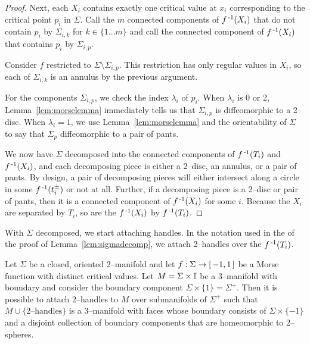 \begin{proof}
	Next, each $X_i$ contains exactly one critical value at $x_i$ corresponding to the critical point $p_i$ in $\Sigma$.
	Call the $m$ connected components of $f^{\,\text{-}1}(X_i)$ that do not contain $p_i$ by $\Sigma_{i,k}$ for $k\in\{1\dots m\}$ and call the connected component of $f^{\,\text{-}1}(X_i)$ that contains $p_i$ by $\Sigma_{i,p}$.
	
	Consider $f$ restricted to $\Sigma\setminus\Sigma_{i,p}$.
	This restriction has only regular values in $X_i$, so each of $\Sigma_{i,k}$ is an annulus by the previous argument.
	
	For the components $\Sigma_{i,p}$, we check the index $\lambda_i$ of $p_i$.
	When $\lambda_i$ is 0 or 2, Lemma~\ref{lem:morselemma} immediately tells us that $\Sigma_{i,p}$ is diffeomorphic to a 2--disc.
	When $\lambda_i=1$, we use Lemma~\ref{lem:morselemma} and the orientability of $\Sigma$ to say that $\Sigma_p$ diffeomorphic to a pair of pants.
	
	We now have $\Sigma$ decomposed into the connected components of $f^{\,\text{-}1}(T_i)$ and $f^{\,\text{-}1}(X_i)$, and each decomposing piece is either a 2--disc, an annulus, or a pair of pants.
	By design, a pair of decomposing pieces will either intersect along a circle in some $f^{\,\text{-}1}(t_i^\pm)$ or not at all.
	Further, if a decomposing piece is a 2--disc or pair of pants, then it is a connected component of $f^{\,\text{-}1}(X_i)$ for some $i$.
	Because the $X_i$ are separated by $T_i$, so are the $f^{\,\text{-}1}(X_i)$ by $f^{\,\text{-}1}(T_i)$.	
\end{proof}

With $\Sigma$ decomposed, we start attaching handles.
In the notation used in the of the proof of Lemma~\ref{lem:sigmadecomp}, we attach 2--handles over the $f^{\,\text{-}1}(T_i)$.

\begin{lem}
	\label{lem:sigma2handles}
	Let $\Sigma$ be a closed, oriented 2--manifold and let $f:\Sigma\to[\,-1,1\,]$ be a Morse function with distinct critical values.
	Let $M=\Sigma\times\mathbb{I}$ be a 3--manifold with boundary and consider the boundary component $\Sigma\times\{1\}=\Sigma^+$.
	Then it is possible to attach 2--handles to $M$ over submanifolds of $\Sigma^+$	such that $M\cup\{\textrm{2--handles}\}$ is a 3--manifold with faces whose boundary consists of $\Sigma\times\{-1\}$ and a disjoint collection of boundary components that are homeomorphic to 2--spheres.
\end{lem}


